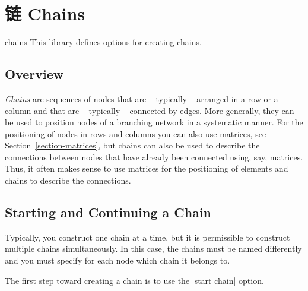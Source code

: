 %
%
%


\section{链 Chains}
\label{section-chains}

\begin{tikzlibrary}{chains}
    This library defines options for creating chains.
\end{tikzlibrary}


\subsection{Overview}

\emph{Chains} are sequences of nodes that are -- typically -- arranged in a row
or a column and that are -- typically -- connected by edges. More generally,
they can be used to position nodes of a branching network in a systematic
manner. For the positioning of nodes in rows and columns you can also use
matrices, see Section~\ref{section-matrices}, but chains can also be used to
describe the connections between nodes that have already been connected using,
say, matrices. Thus, it often makes sense to use matrices for the positioning
of elements and chains to describe the connections.


\subsection{Starting and Continuing a Chain}

Typically, you construct one chain at a time, but it is permissible to
construct multiple chains simultaneously. In this case, the chains must be
named differently and you must specify for each node which chain it belongs to.

The first step toward creating a chain is to use the |start chain| option.

